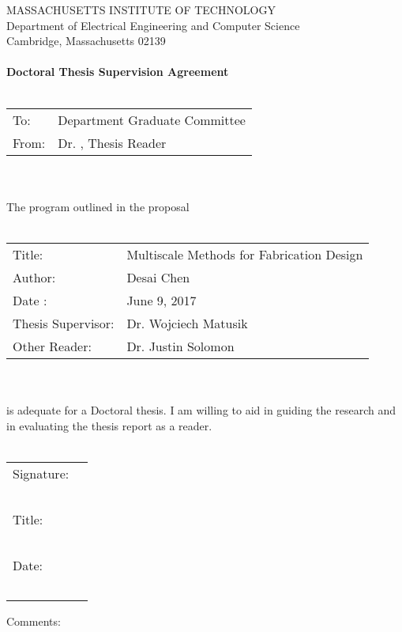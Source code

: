 \documentclass[11pt]{article}
\begin{document}
\newpage
\begin{center}
	MASSACHUSETTS INSTITUTE OF TECHNOLOGY\\
	Department of Electrical Engineering and Computer Science\\
	Cambridge, Massachusetts 02139\\~\\
	\textbf{Doctoral Thesis Supervision Agreement}\\~\\
\end{center}
\begin{tabular}{p{2cm} p{10cm}}
	To: & Department Graduate Committee \\
	From: & Dr. , Thesis Reader
\end{tabular}\\~\\
The program outlined in the proposal\\~\\
\begin{tabular}{p{4cm} l}
	Title: & Multiscale Methods for Fabrication Design\\
	Author: & Desai Chen\\
	Date : & June 9, 2017 \\
	Thesis Supervisor: & Dr. Wojciech Matusik\\
	Other Reader: & Dr. Justin Solomon
\end{tabular}\\~\\
is adequate for a Doctoral thesis. I am willing to aid in guiding the research and in
evaluating the thesis report as a reader.\\~\\
\begin{flushright}
	\begin{tabular}{l l}
		Signature: & \underline{\hspace{6cm}}\\~\\
		Title: & \underline{\hspace{6cm}}\\~\\
		Date: & \underline{\hspace{6cm}}\\~\\
	\end{tabular}
\end{flushright}
Comments:

\newpage
{}






\newpage


\end{document}

